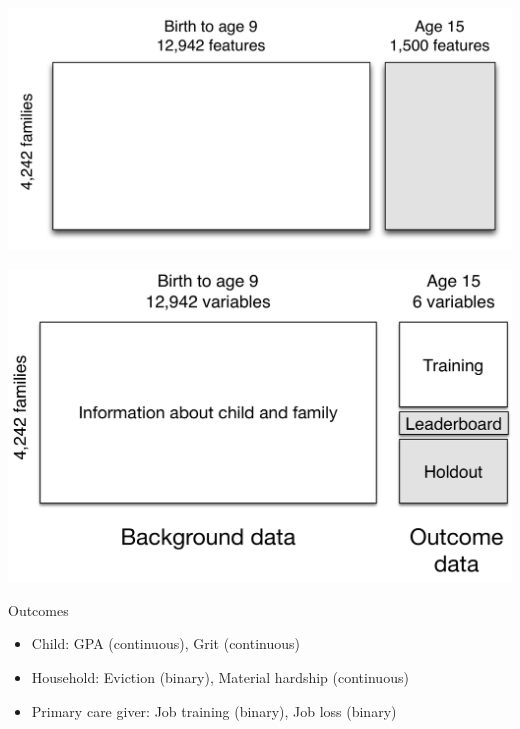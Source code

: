 \documentclass[aspectratio=169]{beamer}
\begin{document}
\begin{frame}

\begin{center}
\includegraphics[width=\textwidth]{figures/ff_design_matrix_ml}
\end{center}

\end{frame}
\begin{frame}

\begin{center}
\includegraphics[width=\textwidth]{figures/ffc_design_matrix_ml}
\end{center}

\end{frame}
\begin{frame}

Outcomes
\begin{itemize}
\item Child: GPA (continuous), Grit (continuous)
\item Household:  Eviction (binary), Material hardship (continuous)
\item Primary care giver: Job training (binary), Job loss (binary)
\end{itemize}

\end{frame}
\end{document}
